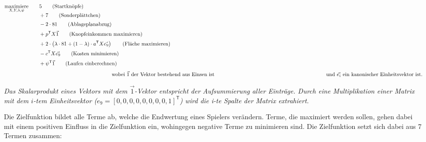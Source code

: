 \begin{align*}
    \smash{\displaystyle{\maximize_{X,Y,\lambda,\psi}}}\qquad & 5 \tag{\text{Startknöpfe}} \\[2pt]
    & + 7 \tag{\text{Sonderplättchen}}\\[2pt]
    & - 2 \cdot 81 \tag{\text{Ablageplanabzug}} \\[2pt]
    & + p^\mathsf{T}X\vec{1} \tag{\text{Knopfeinkommen maximieren}} \\[2pt]
    & + 2 \cdot \left(\lambda\cdot 81 + (1 - \lambda) \cdot a^\mathsf{T}X\vec{e_9}\right) \tag{\text{Fläche maximieren}} \\[2pt]
    & - c^\mathsf{T}X\vec{e_9} \tag{\text{Kosten minimieren}} \\[2pt]
    & + \psi^\mathsf{T}\vec{1} \tag{\text{Laufen einberechnen}} \\[2pt]
    \intertext{\hspace{7cm} wobei $\vec{1}$ der Vektor bestehend aus Einsen ist \newline \hspace*{7.3cm} und $\vec{e_i}$ ein kanonischer Einheitsvektor ist.}
\end{align*}

\vspace*{-1cm}

\emph{Das Skalarprodukt eines Vektors mit dem $\vec{1}$-Vektor entspricht der Aufsummierung aller Einträge. Durch eine Multiplikation einer Matrix mit dem $i$-tem Einheitsvektor ($e_9 = \left[0,0,0,0,0,0,0,0,1\right]^\mathsf{T}$) wird die i-te Spalte der Matrix extrahiert.}

Die Zielfunktion bildet alle Terme ab, welche die Endwertung eines Spielers verändern. Terme, die maximiert werden sollen, gehen dabei mit einem positiven Einfluss in die Zielfunktion ein, wohingegen negative Terme zu minimieren sind. Die Zielfunktion setzt sich dabei aus 7 Termen zusammen:

\pagebreak

